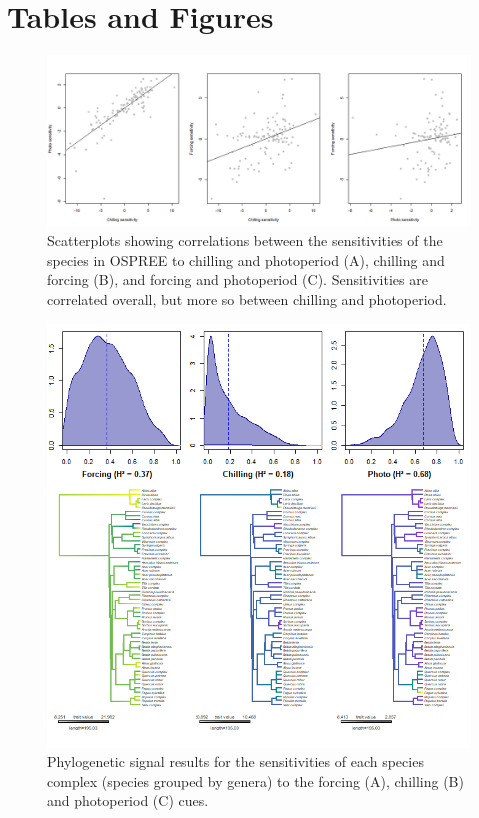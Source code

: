 \documentclass{article}\usepackage[]{graphicx}\usepackage[]{color}
\begin{document}
  






\section*{Tables and Figures} 

\begin{figure} [H]
  \begin{center}
  \includegraphics[width=14cm]{..//..//analyses/phylogeny/figures/Correlations_sensitivities.png}
  \caption{Scatterplots showing correlations between the sensitivities of the species in OSPREE to chilling and photoperiod (A), chilling and forcing (B), and forcing and photoperiod (C). Sensitivities are  correlated overall, but more so between chilling and photoperiod.}
  \label{fig:sensicorrs}
  \end{center}
\end{figure}

  
\begin{figure} [H]
  \begin{center}
  \includegraphics[width=14cm]{..//..//analyses/phylogeny/figures/Sensitivities_phylosig.png}
  \caption{Phylogenetic signal results for the sensitivities of each species complex (species grouped by genera) to the forcing (A), chilling (B) and photoperiod (C) cues.}
  \label{fig:phylosig_complex}
\end{center}
\end{figure}
\end{document}
